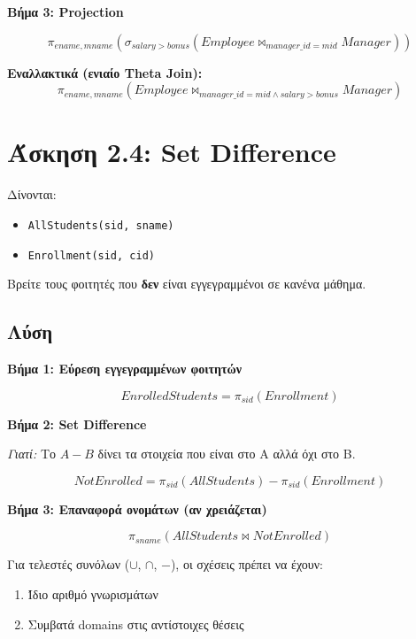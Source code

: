 \textbf{Βήμα 3: Projection}

$$\pi_{ename, mname}(\sigma_{salary > bonus}(Employee \bowtie_{manager\_id = mid} Manager))$$

\textbf{Εναλλακτικά (ενιαίο Theta Join):}
$$\pi_{ename, mname}(Employee \bowtie_{manager\_id = mid \land salary > bonus} Manager)$$

\section{Άσκηση 2.4: Set Difference}

\begin{formulabox}[Εκφώνηση]
Δίνονται:
\begin{itemize}
    \item \texttt{AllStudents(sid, sname)}
    \item \texttt{Enrollment(sid, cid)}
\end{itemize}

Βρείτε τους φοιτητές που \textbf{δεν} είναι εγγεγραμμένοι σε κανένα μάθημα.
\end{formulabox}

\subsection*{Λύση}

\textbf{Βήμα 1: Εύρεση εγγεγραμμένων φοιτητών}

$$EnrolledStudents = \pi_{sid}(Enrollment)$$

\textbf{Βήμα 2: Set Difference}

\textit{Γιατί:} Το $A - B$ δίνει τα στοιχεία που είναι στο A αλλά όχι στο B.

$$NotEnrolled = \pi_{sid}(AllStudents) - \pi_{sid}(Enrollment)$$

\textbf{Βήμα 3: Επαναφορά ονομάτων (αν χρειάζεται)}

$$\pi_{sname}(AllStudents \bowtie NotEnrolled)$$

\begin{warningbox}
Για τελεστές συνόλων ($\cup$, $\cap$, $-$), οι σχέσεις πρέπει να έχουν:
\begin{enumerate}
    \item Ίδιο αριθμό γνωρισμάτων
    \item Συμβατά domains στις αντίστοιχες θέσεις
\end{enumerate}
\end{warningbox}

